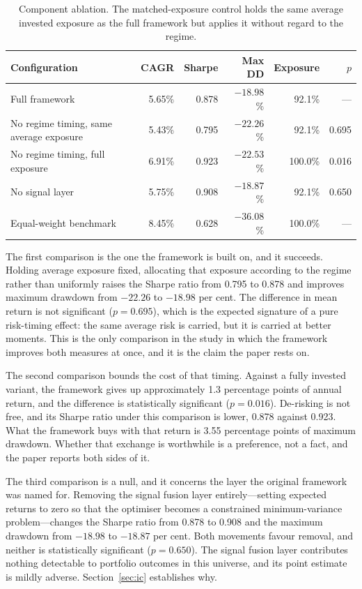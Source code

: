 \begin{table}[!ht]
\centering
\caption{Component ablation. The matched-exposure control holds the same average
invested exposure as the full framework but applies it without regard to the regime.}
\label{tab:ablation}
\small
\begin{tabular}{p{4.8cm}rrrrr}
\hline
\textbf{Configuration} & \textbf{CAGR} & \textbf{Sharpe} & \textbf{Max DD} & \textbf{Exposure} & \textbf{$p$} \\
\hline
Full framework & 5.65\% & 0.878 & $-18.98$\% & 92.1\% & --- \\
No regime timing, same average exposure & 5.43\% & 0.795 & $-22.26$\% & 92.1\% & 0.695 \\
No regime timing, full exposure & 6.91\% & 0.923 & $-22.53$\% & 100.0\% & 0.016 \\
No signal layer & 5.75\% & 0.908 & $-18.87$\% & 92.1\% & 0.650 \\
Equal-weight benchmark & 8.45\% & 0.628 & $-36.08$\% & 100.0\% & --- \\
\hline
\end{tabular}
\end{table}

The first comparison is the one the framework is built on, and it succeeds. Holding
average exposure fixed, allocating that exposure according to the regime rather than
uniformly raises the Sharpe ratio from 0.795 to 0.878 and improves maximum drawdown
from $-22.26$ to $-18.98$ per cent. The difference in mean return is not significant
($p = 0.695$), which is the expected signature of a pure risk-timing effect: the same
average risk is carried, but it is carried at better moments. This is the only
comparison in the study in which the framework improves both measures at once, and it
is the claim the paper rests on.

The second comparison bounds the cost of that timing. Against a fully invested variant,
the framework gives up approximately 1.3 percentage points of annual return, and the
difference is statistically significant ($p = 0.016$). De-risking is not free, and its
Sharpe ratio under this comparison is lower, 0.878 against 0.923. What the framework
buys with that return is 3.55 percentage points of maximum drawdown. Whether that
exchange is worthwhile is a preference, not a fact, and the paper reports both sides of
it.

The third comparison is a null, and it concerns the layer the original framework was
named for. Removing the signal fusion layer entirely---setting expected returns to
zero so that the optimiser becomes a constrained minimum-variance problem---changes the
Sharpe ratio from 0.878 to 0.908 and the maximum drawdown from $-18.98$ to $-18.87$ per
cent. Both movements favour removal, and neither is statistically significant
($p = 0.650$). The signal fusion layer contributes nothing detectable to portfolio
outcomes in this universe, and its point estimate is mildly adverse.
Section~\ref{sec:ic} establishes why.

